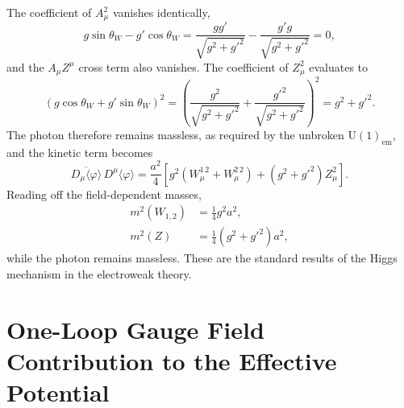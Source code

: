 The coefficient of $A_\mu^2$ vanishes identically,
\begin{equation}
	g\sin\theta_W - g'\cos\theta_W
	= \frac{gg'}{\sqrt{g^2+g'^2}}
	- \frac{g'g}{\sqrt{g^2+g'^2}} = 0,
\end{equation}
and the $A_\mu Z^\mu$ cross term also vanishes. The coefficient of
$Z_\mu^2$ evaluates to
\begin{equation}
	\left(g\cos\theta_W+g'\sin\theta_W\right)^2
	= \left(\frac{g^2}{\sqrt{g^2+g'^2}}
	+\frac{g'^2}{\sqrt{g^2+g'^2}}\right)^2
	= g^2+g'^2.
\end{equation}
The photon therefore remains massless, as required by the unbroken
$\mathrm{U}(1)_{\text{em}}$, and the kinetic term becomes
\begin{equation}
	\boxed{\overline{D_\mu\langle\varphi\rangle}\,D^\mu\langle\varphi\rangle
		= \frac{a^2}{4}\left[g^2\left(W_\mu^{1\,2}+W_\mu^{2\,2}\right)
			+ \left(g^2+g'^2\right)Z_\mu^2\right].}
\end{equation}
Reading off the field-dependent masses,
\begin{align}
	m^2(W_{1,2}) & = \frac{1}{4}g^2 a^2,       \\
	m^2(Z)       & = \frac{1}{4}(g^2+g'^2)a^2,
\end{align}
while the photon remains massless. These are the standard results of the
Higgs mechanism in the electroweak theory.

\section{One-Loop Gauge Field Contribution to the Effective Potential}

